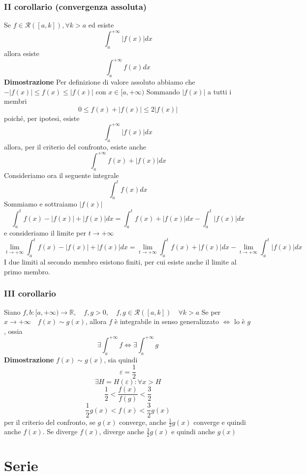 \documentclass[12pt]{article}
\begin{document}
\subsubsection{II corollario (convergenza assoluta)}
Se $f \in \mathscr{R}([a,k]), \forall k > a$ ed esiste
\[ \int_a^{+\infty}|f(x)|dx \]
allora esiste
\[ \int_a^{+\infty}f(x)dx \]
\textbf{Dimostrazione}\newline
Per definizione di valore assoluto abbiamo che $-|f(x)|\leq f(x) \leq |f(x)|$ con $x\in [a, +\infty)$\newline
Sommando $|f(x)|$ a tutti i membri
\[ 0\leq f(x) + |f(x)| \leq 2|f(x)| \]
poiché, per ipotesi, esiste
\[ \int_{a}^{+\infty} |f(x)| dx\]
 allora, per il criterio del confronto, esiste anche 
\[ \int_{a}^{+\infty} f(x) + |f(x)| dx \]
Consideriamo ora il seguente integrale
\[ \int_{a}^{t} f(x) dx \]
Sommiamo e sottraiamo $|f(x)|$
\[ \int_{a}^{t} f(x) - |f(x)| + |f(x)| dx = \int_{a}^{t} f(x) + |f(x)| dx - \int_{a}^{t} |f(x)| dx\]
e consideriamo il limite per $t \to +\infty$
\[ \lim_{t \to +\infty} \int_{a}^{t} f(x) - |f(x)| + |f(x)| dx = \lim_{t \to +\infty} \int_{a}^{t} f(x) + |f(x)| dx - \lim_{t \to +\infty} \int_{a}^{t} |f(x)| dx\]
I due limiti al secondo membro esistono finiti, per cui esiste anche il limite al primo membro.

\subsubsection{III corollario}
Siano  $f,b : [a, +\infty) \to \mathbb{R}, \quad f,g>0, \quad f,g \in \mathscr{R}([a,k]) \quad \forall k>a$\newline
Se per $x \to +\infty \quad f(x) \sim g(x)$, allora\newline
$f$ è integrabile in senso generalizzato $\Leftrightarrow$ lo è $g$, ossia
\[ \exists \int_a^{+\infty} f \Leftrightarrow \exists \int_a^{+\infty} g\]
\textbf{Dimostrazione}\newline
$f(x)\sim g(x)$, sia quindi
\[ \varepsilon = \frac{1}{2}\]
\[ \exists H = H(\varepsilon) : \forall x > H \]
\[ \frac{1}{2} < \frac{f(x)}{f(g)} < \frac{3}{2} \]
\[ \frac{1}{2} g(x) < f(x) < \frac{3}{2} g(x)\]
per il criterio del confronto, se $g(x)$ converge, anche $\frac{1}{2} g(x)$ converge e quindi anche $f(x)$. Se diverge $f(x)$, diverge anche $\frac{3}{2}g(x)$ e quindi anche $g(x)$

\section{Serie}
\end{document}
